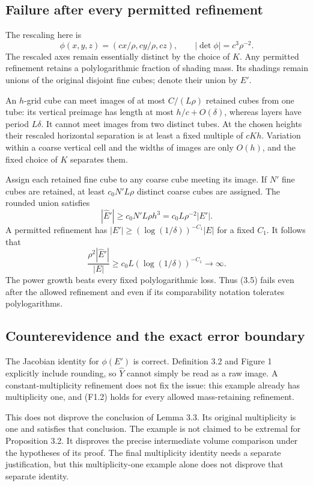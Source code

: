 \documentclass[10pt]{article}
\begin{document}
\subsection*{Failure after every permitted refinement}
The rescaling here is \[\phi(x,y,z)=(cx/\rho,cy/\rho,cz),\qquad
 |\det\phi|=c^3\rho^{-2}.\] The rescaled axes remain essentially distinct by the choice of \(K\). Any permitted refinement retains a polylogarithmic fraction of shading mass. Its shadings remain unions of the original disjoint fine cubes; denote their union by \(E'\).\par
An \(h\)-grid cube can meet images of at most \(C/(L\rho)\) retained cubes from one tube: its vertical preimage has length at most \(h/c+O(\delta)\), whereas layers have period \(L\delta\). It cannot meet images from two distinct tubes. At the chosen heights their rescaled horizontal separation is at least a fixed multiple of \(cKh\). Variation within a coarse vertical cell and the widths of images are only \(O(h)\), and the fixed choice of \(K\) separates them.\par
Assign each retained fine cube to any coarse cube meeting its image. If \(N'\) fine cubes are retained, at least \(c_0N'L\rho\) distinct coarse cubes are assigned. The rounded union satisfies \[|\widehat E'|\ge c_0N'L\rho h^3
             =c_0L\rho^{-2}|E'|.\] A permitted refinement has \(|E'|\ge(\log(1/\delta))^{-C_1}|E|\) for a fixed \(C_1\). It follows that \[\frac{\rho^2|\widehat E'|}{|E|}
 \ge c_0L(\log(1/\delta))^{-C_1}\longrightarrow\infty.
 \tag{F1.2}\] The power growth beats every fixed polylogarithmic loss. Thus (3.5) fails even after the allowed refinement and even if its comparability notation tolerates polylogarithms.\par
\subsection*{Counterevidence and the exact error boundary}
The Jacobian identity for \(\phi(E')\) is correct. Definition 3.2 and Figure 1 explicitly include rounding, so \(\widehat Y\) cannot simply be read as a raw image. A constant-multiplicity refinement does not fix the issue: this example already has multiplicity one, and (F1.2) holds for every allowed mass-retaining refinement.\par
This does not disprove the conclusion of Lemma 3.3. Its original multiplicity is one and satisfies that conclusion. The example is not claimed to be extremal for Proposition 3.2. It disproves the precise intermediate volume comparison under the hypotheses of its proof. The final multiplicity identity needs a separate justification, but this multiplicity-one example alone does not disprove that separate identity.\par
\end{document}
